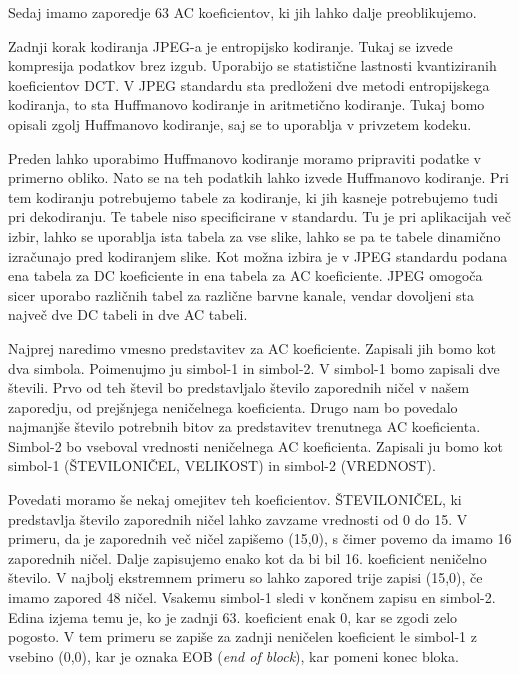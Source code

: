 \documentclass[a4paper,12pt,openright]{book}
\begin{document}
Sedaj imamo zaporedje 63 AC koeficientov, ki jih lahko dalje preoblikujemo.\par
Zadnji korak kodiranja JPEG-a je entropijsko kodiranje. Tukaj se izvede kompresija podatkov brez izgub. Uporabijo se statistične lastnosti kvantiziranih koeficientov DCT. V JPEG standardu sta predloženi dve metodi entropijskega kodiranja, to sta Huffmanovo kodiranje in aritmetično kodiranje. Tukaj bomo opisali zgolj Huffmanovo kodiranje, saj se to uporablja v privzetem kodeku.\par
Preden lahko uporabimo Huffmanovo kodiranje moramo pripraviti podatke v primerno obliko.
Nato se na teh podatkih lahko izvede Huffmanovo kodiranje. Pri tem kodiranju potrebujemo tabele za kodiranje, ki jih kasneje potrebujemo tudi pri dekodiranju. Te tabele niso specificirane v standardu. Tu je pri aplikacijah več izbir, lahko se uporablja ista tabela za vse slike, lahko se pa te tabele dinamično izračunajo pred kodiranjem slike. Kot možna izbira je v JPEG standardu podana ena tabela za DC koeficiente in ena tabela za AC koeficiente. JPEG omogoča sicer uporabo različnih tabel za različne barvne kanale, vendar dovoljeni sta največ dve DC tabeli in dve AC tabeli.\par
Najprej naredimo vmesno predstavitev za AC koeficiente. Zapisali jih bomo kot dva simbola. Poimenujmo ju simbol-1 in simbol-2. V simbol-1 bomo zapisali dve števili. Prvo od teh števil bo predstavljalo število zaporednih ničel v našem zaporedju, od prejšnjega neničelnega koeficienta. Drugo nam bo povedalo najmanjše število potrebnih bitov za predstavitev trenutnega AC koeficienta. Simbol-2 bo vseboval vrednosti neničelnega AC koeficienta. Zapisali ju bomo kot simbol-1 (ŠTEVILONIČEL, VELIKOST) in simbol-2 (VREDNOST).\par
Povedati moramo še nekaj omejitev teh koeficientov. ŠTEVILONIČEL, ki predstavlja število zaporednih ničel lahko zavzame vrednosti od 0 do 15. V primeru, da je zaporednih več ničel zapišemo (15,0), s čimer povemo da imamo 16 zaporednih ničel. Dalje zapisujemo enako kot da bi bil 16. koeficient neničelno število. V najbolj ekstremnem primeru so lahko zapored trije zapisi (15,0), če imamo zapored 48 ničel. Vsakemu simbol-1 sledi v končnem zapisu en simbol-2. Edina izjema temu je, ko je zadnji 63. koeficient enak 0, kar se zgodi zelo pogosto. V tem primeru se zapiše za zadnji neničelen koeficient le simbol-1 z vsebino (0,0), kar je oznaka EOB (\textit{end of block}), kar pomeni konec bloka.\par
\end{document}
